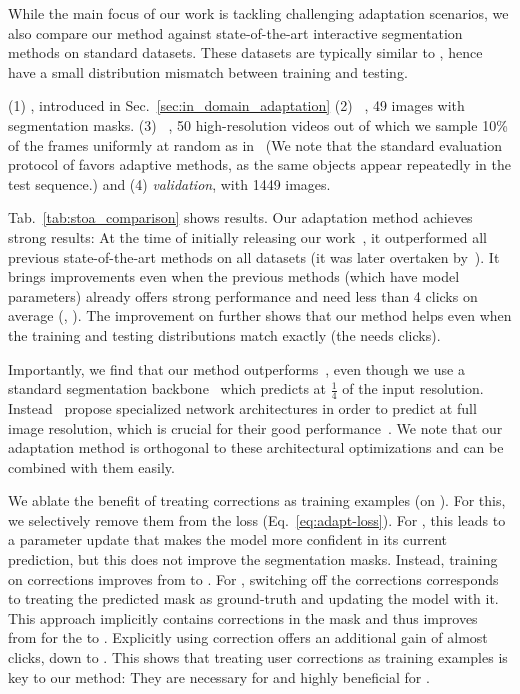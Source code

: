 While the main focus of our work is tackling challenging adaptation scenarios, we also compare our method
against state-of-the-art interactive segmentation methods on standard datasets.
These datasets are typically similar to \pascal{}, hence have a small distribution mismatch between training and testing.


(1) \berkeley{}, introduced in Sec.~\ref{sec:in_domain_adaptation}
(2) \textit{\grabcut{}}~\cite{Rother04-tdfixed}, 49 images with segmentation masks.
(3) \textit{\davis{}}~\cite{perazzi16cvpr}, 50 high-resolution videos out of which we sample 10\% of the frames uniformly at random as in~\cite{li18cvpr,jang19cvpr} (We note that the standard evaluation protocol of \davis{} favors adaptive methods, as the same objects appear repeatedly in the test sequence.) and 
(4) \textit{\pascal{} validation}, with 1449 images.


Tab.~\ref{tab:stoa_comparison} shows results. Our adaptation method achieves strong results:
At the time of initially releasing our work~\cite{kontogianni19arxiv}, it outperformed all previous state-of-the-art methods on all datasets (it was later overtaken by~\cite{sofiiuk20cvpr}).
It brings improvements even when the previous methods (which have \fixedmodel{} model parameters) already offers strong performance and need less than 4 clicks on average (\pascal{}, \grabcut{}). The improvement on \pascal{} further shows that our method helps even when the training and testing distributions match exactly (the \fixedmodellong{} needs  clicks).

Importantly, we find that our method outperforms~\cite{li18cvpr,jang19cvpr}, even though we use a standard segmentation backbone~\cite{chen18eccv} which predicts at $\frac{1}{4}$ of the input resolution. Instead~\cite{li18cvpr,jang19cvpr} propose specialized network architectures in order to predict at full image resolution, which is crucial for their good performance~\cite{jang19cvpr}.
We note that our adaptation method is orthogonal to these architectural optimizations and can be combined with them easily.

\label{sec:ablation}
We ablate the benefit of treating corrections as training examples (on \cocounseenlarge{}).
For this, we selectively remove them from the loss (Eq.~\eqref{eq:adapt-loss}).
For \imageSGD{}, this leads to a parameter update that makes the model more confident in its current prediction, but this does not improve the segmentation masks. Instead, training on corrections improves  from  to .
For \datasetSGD{}, switching off the corrections corresponds to treating the predicted mask as ground-truth and updating the model with it.
This approach implicitly contains corrections in the mask and thus improves ~ from  for the \fixedmodellong{} to .
Explicitly using correction offers an additional gain of almost  clicks, down to .
This shows that treating user corrections as training examples is key to our method:
They are necessary for \imageSGD{} and highly beneficial for \datasetSGD{}.

